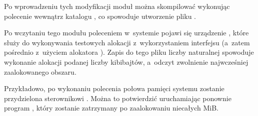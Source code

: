 Po wprowadzeniu tych modyfikacji moduł można skompilować wykonując
polecenie  wewnątrz katalogu , co spowoduje
utworzenie pliku .

Po wczytaniu tego modułu poleceniem 
w~systemie pojawi się urządzenie , które służy do
wykonywania testowych alokacji z~wykorzystaniem interfejsu  
(a~zatem pośrednio z~użyciem alokatora ).  Zapis do tego pliku
liczby naturalnej spowoduje wykonanie alokacji podanej liczby
kibibajtów, a~odczyt zwolnienie najwcześniej zaalokowanego obszaru.

Przykładowo, po wykonaniu polecenia 
połowa pamięci systemu zostanie przydzielona sterownikowi
.  Można to potwierdzić uruchamiając ponownie program
, który zostanie zatrzymany po zaalokowaniu niecałych
\unit[500]{MiB}.
